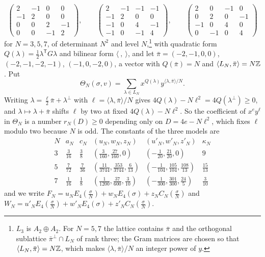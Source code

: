 \[
\begin{pmatrix}2&-1&0&0\\-1&2&0&0\\0&0&2&-1\\0&0&-1&2\end{pmatrix},\qquad
\begin{pmatrix}2&-1&-1&-1\\-1&2&0&0\\-1&0&4&-1\\-1&0&-1&4\end{pmatrix},\qquad
\begin{pmatrix}2&0&-1&0\\0&2&0&-1\\-1&0&4&0\\0&-1&0&4\end{pmatrix}
\]
for $N=3,5,7$, of determinant $N^2$ and level $N$,\footnote{$L_3$ is $A_2\oplus A_2$. For $N=5,7$ the lattice contains $\bar\pi$ and the orthogonal sublattice $\bar\pi^\perp\cap L_N$ of rank three; the Gram matrices are chosen so that $\langle L_N,\bar\pi\rangle=N\mathbb{Z}$, which makes $\langle\lambda,\bar\pi\rangle/N$ an integer power of $y$.} with quadratic form $Q(\lambda)=\frac12\lambda^{\mathsf T}G\lambda$ and bilinear form $\langle\ ,\ \rangle$, and let $\bar\pi=(-2,-1,0,0)$, $(-2,-1,-2,-1)$, $(-1,0,-2,0)$, a vector with $Q(\bar\pi)=N$ and $\langle L_N,\bar\pi\rangle=N\mathbb{Z}$. Put
\[
\Theta_N(\sigma,v)=\sum_{\lambda\in L_N}x^{Q(\lambda)}y^{\langle\lambda,\bar\pi\rangle/N}.
\]
Writing $\lambda=\frac\ell2\bar\pi+\lambda^\perp$ with $\ell=\langle\lambda,\bar\pi\rangle/N$ gives $4Q(\lambda)-N\ell^2=4Q(\lambda^\perp)\ge0$, and $\lambda\mapsto\lambda+\bar\pi$ shifts $\ell$ by two at fixed $4Q(\lambda)-N\ell^2$. So the coefficient of $x^ey^\ell$ in $\Theta_N$ is a number $r_N(D)\ge0$ depending only on $D=4e-N\ell^2$, which fixes $\ell$ modulo two because $N$ is odd. The constants of the three models are
\[
\begin{array}{c|ccccc}
N&a_N&c_N&(u_N,w_N,z_N)&(u'_N,w'_N,z'_N)&\kappa_N\\\hline
3&\frac3{16}&\frac38&(\frac3{160},\frac{27}{160},0)&(-\frac1{20},\frac{21}{20},0)&9\\[2pt]
5&\frac7{72}&\frac7{36}&(\frac{11}{3744},\frac{353}{3744},\frac6{13})&(-\frac1{104},\frac{105}{104},\frac{108}{13})&\frac{15}{13}\\[2pt]
7&\frac1{16}&\frac18&(\frac1{1200},\frac{37}{600},\frac3{10})&(-\frac1{300},\frac{301}{300},\frac{24}5)&\frac3{10}
\end{array}
\]
and we write $F_N=u_NE_4(\tfrac\sigma N)+w_NE_4(\sigma)+z_NC_N(\tfrac\sigma N)$ and $W_N=u'_NE_4(\tfrac\sigma N)+w'_NE_4(\sigma)+z'_NC_N(\tfrac\sigma N)$.

